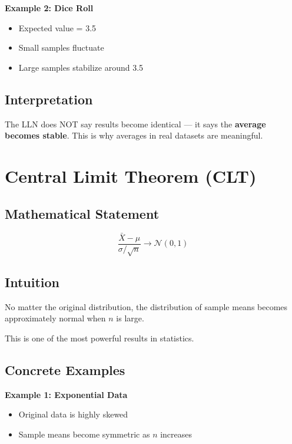 \documentclass[a4paper,12pt]{article}
\begin{document}
\textbf{Example 2: Dice Roll}
\begin{itemize}
\item Expected value = 3.5
\item Small samples fluctuate
\item Large samples stabilize around 3.5
\end{itemize}

\subsection{Interpretation}

The LLN does NOT say results become identical — it says the \textbf{average becomes stable}. This is why averages in real datasets are meaningful.

\section{Central Limit Theorem (CLT)}

\subsection{Mathematical Statement}

\[
\frac{\bar{X} - \mu}{\sigma / \sqrt{n}} \rightarrow \mathcal{N}(0,1)
\]

\subsection{Intuition}

\begin{tcolorbox}
No matter the original distribution, the distribution of sample means becomes approximately normal when $n$ is large.
\end{tcolorbox}

This is one of the most powerful results in statistics.

\subsection{Concrete Examples}

\textbf{Example 1: Exponential Data}
\begin{itemize}
\item Original data is highly skewed
\item Sample means become symmetric as $n$ increases
\end{itemize}
\end{document}
